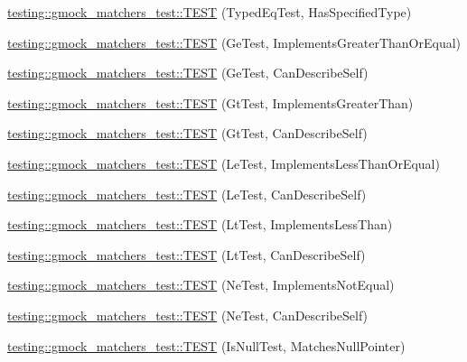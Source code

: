 \begin{DoxyCompactItemize}
\item 
\hyperlink{namespacetesting_1_1gmock__matchers__test_ae0255a5de2ef537512379c3f8ff9e34f}{testing\+::gmock\+\_\+matchers\+\_\+test\+::\+T\+E\+ST} (Typed\+Eq\+Test, Has\+Specified\+Type)
\item 
\hyperlink{namespacetesting_1_1gmock__matchers__test_a7d73fdbbee36ccf241ec6e328175655b}{testing\+::gmock\+\_\+matchers\+\_\+test\+::\+T\+E\+ST} (Ge\+Test, Implements\+Greater\+Than\+Or\+Equal)
\item 
\hyperlink{namespacetesting_1_1gmock__matchers__test_a2718c8d5456b62ab7b060b2723939a72}{testing\+::gmock\+\_\+matchers\+\_\+test\+::\+T\+E\+ST} (Ge\+Test, Can\+Describe\+Self)
\item 
\hyperlink{namespacetesting_1_1gmock__matchers__test_a87a9ac189a12e0b85964f03b3b9998b1}{testing\+::gmock\+\_\+matchers\+\_\+test\+::\+T\+E\+ST} (Gt\+Test, Implements\+Greater\+Than)
\item 
\hyperlink{namespacetesting_1_1gmock__matchers__test_a2981bbdbf9cbd8864a6dde4ff4b06050}{testing\+::gmock\+\_\+matchers\+\_\+test\+::\+T\+E\+ST} (Gt\+Test, Can\+Describe\+Self)
\item 
\hyperlink{namespacetesting_1_1gmock__matchers__test_af0cd1cfc3ff1272bfe06f31c5eb3ab8b}{testing\+::gmock\+\_\+matchers\+\_\+test\+::\+T\+E\+ST} (Le\+Test, Implements\+Less\+Than\+Or\+Equal)
\item 
\hyperlink{namespacetesting_1_1gmock__matchers__test_a463bc4f6cdca489c05ad691e1254e2f3}{testing\+::gmock\+\_\+matchers\+\_\+test\+::\+T\+E\+ST} (Le\+Test, Can\+Describe\+Self)
\item 
\hyperlink{namespacetesting_1_1gmock__matchers__test_a9f332401730e637d5c3923924dc339e3}{testing\+::gmock\+\_\+matchers\+\_\+test\+::\+T\+E\+ST} (Lt\+Test, Implements\+Less\+Than)
\item 
\hyperlink{namespacetesting_1_1gmock__matchers__test_ae29bb32c74970fc22e7ac5d86e7e6c26}{testing\+::gmock\+\_\+matchers\+\_\+test\+::\+T\+E\+ST} (Lt\+Test, Can\+Describe\+Self)
\item 
\hyperlink{namespacetesting_1_1gmock__matchers__test_a7319f919e57cf349f733bbdb56177daf}{testing\+::gmock\+\_\+matchers\+\_\+test\+::\+T\+E\+ST} (Ne\+Test, Implements\+Not\+Equal)
\item 
\hyperlink{namespacetesting_1_1gmock__matchers__test_a8a743510a5256803d75c2d7735ec515a}{testing\+::gmock\+\_\+matchers\+\_\+test\+::\+T\+E\+ST} (Ne\+Test, Can\+Describe\+Self)
\item 
\hyperlink{namespacetesting_1_1gmock__matchers__test_ae1c2971c161e051bf52b86b62c51bb95}{testing\+::gmock\+\_\+matchers\+\_\+test\+::\+T\+E\+ST} (Is\+Null\+Test, Matches\+Null\+Pointer)

\end{DoxyCompactItemize}
